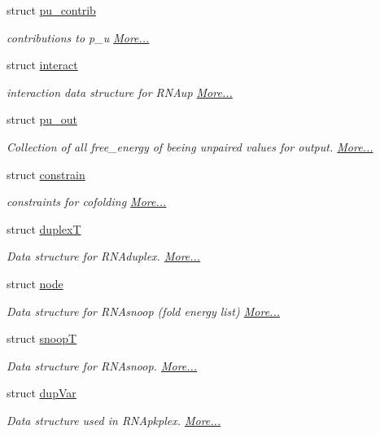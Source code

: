 \begin{DoxyCompactItemize}
struct \hyperlink{group__data__structures_structpu__contrib}{pu\+\_\+contrib}
\begin{DoxyCompactList}\small\item\em contributions to p\+\_\+u  \hyperlink{group__data__structures_structpu__contrib}{More...}\end{DoxyCompactList}\item 
struct \hyperlink{group__data__structures_structinteract}{interact}
\begin{DoxyCompactList}\small\item\em interaction data structure for R\+N\+Aup  \hyperlink{group__data__structures_structinteract}{More...}\end{DoxyCompactList}\item 
struct \hyperlink{group__data__structures_structpu__out}{pu\+\_\+out}
\begin{DoxyCompactList}\small\item\em Collection of all free\+\_\+energy of beeing unpaired values for output.  \hyperlink{group__data__structures_structpu__out}{More...}\end{DoxyCompactList}\item 
struct \hyperlink{group__data__structures_structconstrain}{constrain}
\begin{DoxyCompactList}\small\item\em constraints for cofolding  \hyperlink{group__data__structures_structconstrain}{More...}\end{DoxyCompactList}\item 
struct \hyperlink{group__data__structures_structduplexT}{duplexT}
\begin{DoxyCompactList}\small\item\em Data structure for R\+N\+Aduplex.  \hyperlink{group__data__structures_structduplexT}{More...}\end{DoxyCompactList}\item 
struct \hyperlink{group__data__structures_structnode}{node}
\begin{DoxyCompactList}\small\item\em Data structure for R\+N\+Asnoop (fold energy list)  \hyperlink{group__data__structures_structnode}{More...}\end{DoxyCompactList}\item 
struct \hyperlink{group__data__structures_structsnoopT}{snoopT}
\begin{DoxyCompactList}\small\item\em Data structure for R\+N\+Asnoop.  \hyperlink{group__data__structures_structsnoopT}{More...}\end{DoxyCompactList}\item 
struct \hyperlink{group__data__structures_structdupVar}{dup\+Var}
\begin{DoxyCompactList}\small\item\em Data structure used in R\+N\+Apkplex.  \hyperlink{group__data__structures_structdupVar}{More...}\end{DoxyCompactList}\end{DoxyCompactItemize}
